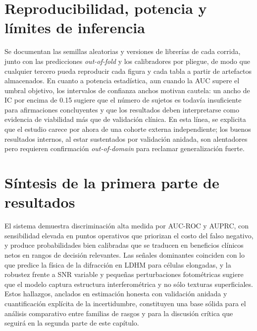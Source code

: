 \section*{Reproducibilidad, potencia y límites de inferencia}
Se documentan las semillas aleatorias y versiones de librerías de cada corrida, junto con las predicciones \emph{out-of-fold} y los calibradores por pliegue, de modo que cualquier tercero pueda reproducir cada figura y cada tabla a partir de artefactos almacenados. En cuanto a potencia estadística, aun cuando la AUC supere el umbral objetivo, los intervalos de confianza anchos motivan cautela: un ancho de IC por encima de 0.15 sugiere que el número de sujetos es todavía insuficiente para afirmaciones concluyentes y que los resultados deben interpretarse como evidencia de viabilidad más que de validación clínica. En esta línea, se explicita que el estudio carece por ahora de una cohorte externa independiente; los buenos resultados internos, al estar sustentados por validación anidada, son alentadores pero requieren confirmación \emph{out-of-domain} para reclamar generalización fuerte.

\section*{Síntesis de la primera parte de resultados}
El sistema demuestra discriminación alta medida por AUC-ROC y AUPRC, con sensibilidad elevada en puntos operativos que priorizan el costo del falso negativo, y produce probabilidades bien calibradas que se traducen en beneficios clínicos netos en rangos de decisión relevantes. Las señales dominantes coinciden con lo que predice la física de la difracción en LDHM para células elongadas, y la robustez frente a SNR variable y pequeñas perturbaciones fotométricas sugiere que el modelo captura estructura interferométrica y no sólo texturas superficiales. Estos hallazgos, anclados en estimación honesta con validación anidada y cuantificación explícita de la incertidumbre, constituyen una base sólida para el análisis comparativo entre familias de rasgos y para la discusión crítica que seguirá en la segunda parte de este capítulo.



